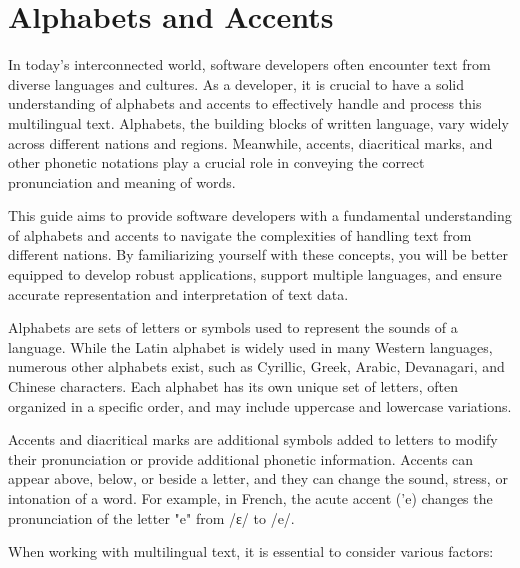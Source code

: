 \chapter{Alphabets and Accents}

In today's interconnected world, software developers often encounter
text from diverse languages and cultures. As a developer, it is
crucial to have a solid understanding of alphabets and accents to
effectively handle and process this multilingual text. Alphabets, the
building blocks of written language, vary widely across different
nations and regions. Meanwhile, accents, diacritical marks, and other
phonetic notations play a crucial role in conveying the correct
pronunciation and meaning of words.  

This guide aims to provide software developers with a fundamental
understanding of alphabets and accents to navigate the complexities of
handling text from different nations. By familiarizing yourself with
these concepts, you will be better equipped to develop robust
applications, support multiple languages, and ensure accurate
representation and interpretation of text data.

Alphabets are sets of letters or symbols used to represent the sounds
of a language. While the Latin alphabet is widely used in many Western
languages, numerous other alphabets exist, such as Cyrillic, Greek,
Arabic, Devanagari, and Chinese characters. Each alphabet has its own
unique set of letters, often organized in a specific order, and may
include uppercase and lowercase variations.

Accents and diacritical marks are additional symbols added to letters
to modify their pronunciation or provide additional phonetic
information. Accents can appear above, below, or beside a letter, and
they can change the sound, stress, or intonation of a word. For
example, in French, the acute accent ('e) changes the pronunciation of
the letter "e" from /ɛ/ to /e/.

When working with multilingual text, it is essential to consider
various factors:

